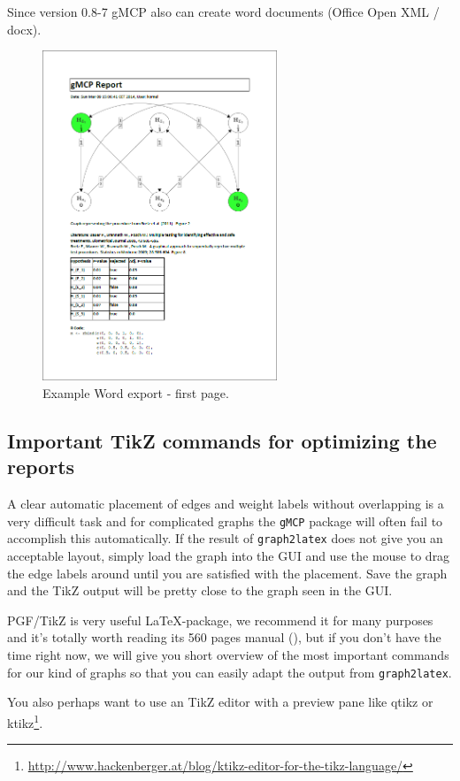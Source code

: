 \documentclass[a4paper, 10pt]{article}\usepackage[]{graphicx}\usepackage[]{color}
\numberwithin{equation}{section}
\theoremstyle{definition}
\theoremstyle{plain}
\begin{document}
Since version 0.8-7 gMCP also can create word documents (Office Open XML / docx).

\begin{figure}[ht]
  \centering    
  \includegraphics[width=7cm]{pictures/docxExport.png}      
  \caption{\label{fig:wordexample} Example Word export - first page.}
\end{figure}

\subsection{Important TikZ commands for optimizing the reports}
A clear automatic placement of edges and weight labels without
overlapping is a very difficult task and for complicated graphs the
\texttt{gMCP} package will often fail to accomplish this
automatically. If the result of \texttt{graph2latex} does not give you
an acceptable layout, simply load the graph into the GUI and use the
mouse to drag the edge labels around until you are satisfied with the
placement. Save the graph and the TikZ output will be pretty close to
the graph seen in the GUI.

PGF/TikZ is very useful \LaTeX-package, we recommend it for many
purposes and it's totally worth reading its 560 pages manual
(\cite{TikZ}), but if you don't have the time right now, we will give
you short overview of the most important commands for our kind of
graphs so that you can easily adapt the output from
\texttt{graph2latex}.

You also perhaps want to use an TikZ editor with a preview pane like qtikz
or
ktikz\footnote{\url{http://www.hackenberger.at/blog/ktikz-editor-for-the-tikz-language/}}.
\end{document}
